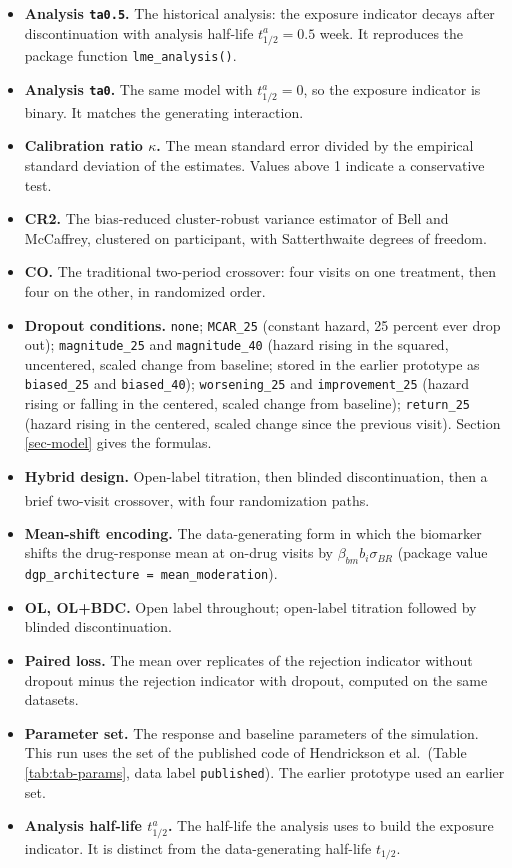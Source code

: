 \documentclass[
  11pt,
]{article}
\newcounter{none} %
\providecommand{\tightlist}{%
  \setlength{\itemsep}{0pt}\setlength{\parskip}{0pt}}
\begin{document}
\begin{itemize}
\tightlist
\item
  \textbf{Analysis \texttt{ta0.5}.} The historical analysis: the exposure
  indicator decays after discontinuation with analysis half-life
  \(t^a_{1/2} = 0.5\) week. It reproduces the package function
  \texttt{lme\_analysis()}.
\item
  \textbf{Analysis \texttt{ta0}.} The same model with \(t^a_{1/2} = 0\), so the
  exposure indicator is binary. It matches the generating interaction.
\item
  \textbf{Calibration ratio \(\kappa\).} The mean standard error divided by
  the empirical standard deviation of the estimates. Values above 1
  indicate a conservative test.
\item
  \textbf{CR2.} The bias-reduced cluster-robust variance estimator of Bell
  and McCaffrey, clustered on participant, with Satterthwaite degrees
  of freedom.
\item
  \textbf{CO.} The traditional two-period crossover: four visits on one
  treatment, then four on the other, in randomized order.
\item
  \textbf{Dropout conditions.} \texttt{none}; \texttt{MCAR\_25} (constant hazard, 25
  percent ever drop out); \texttt{magnitude\_25} and \texttt{magnitude\_40} (hazard
  rising in the squared, uncentered, scaled change from baseline;
  stored in the earlier prototype as \texttt{biased\_25} and \texttt{biased\_40});
  \texttt{worsening\_25} and \texttt{improvement\_25} (hazard rising or falling in the
  centered, scaled change from baseline); \texttt{return\_25} (hazard rising in
  the centered, scaled change since the previous visit). Section
  \ref{sec-model} gives the formulas.
\item
  \textbf{Hybrid design.} Open-label titration, then blinded
  discontinuation, then a brief two-visit crossover, with four
  randomization paths\textsuperscript{}.
\item
  \textbf{Mean-shift encoding.} The data-generating form in which the
  biomarker shifts the drug-response mean at on-drug visits by
  \(\beta_{bm} b_i \sigma_{BR}\) (package value
  \texttt{dgp\_architecture\ =\ \textquotesingle{}mean\_moderation\textquotesingle{}}).
\item
  \textbf{OL, OL+BDC.} Open label throughout; open-label titration followed
  by blinded discontinuation.
\item
  \textbf{Paired loss.} The mean over replicates of the rejection indicator
  without dropout minus the rejection indicator with dropout, computed
  on the same datasets.
\item
  \textbf{Parameter set.} The response and baseline parameters of the
  simulation. This run uses the set of the published code of
  Hendrickson et al.~(Table \ref{tab:tab-params}, data label
  \texttt{published}). The earlier prototype used an earlier set.
\item
  \textbf{Analysis half-life \(t^a_{1/2}\).} The half-life the analysis uses
  to build the exposure indicator. It is distinct from the
  data-generating half-life \(t_{1/2}\).
\end{itemize}
\end{document}
